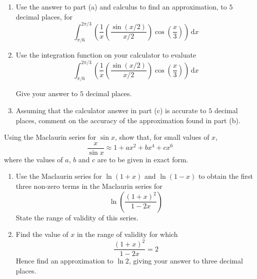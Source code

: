\documentclass[leqno]{article}
\begin{document}
\begin{enumerate}[
  label=\textbf{\arabic*.},
  leftmargin=*,
  topsep=0pt,
  partopsep=0pt,
  parsep=0pt
]
\begin{enumerate}[label=\textbf{(\alph*)}]
  Give each term in simplest form.  \\
  \item Use the answer to part (a) and calculus to find an approximation, to $5$ decimal places, for
  \[
  \int_{\pi/6}^{2\pi/3} \left( \frac{1}{x}\left(\frac{\sin(x/2)}{x/2}\right)\cos\left(\frac{x}{3}\right) \right) \, \mathrm{d}x
  \]
  \item Use the integration function on your calculator to evaluate
  \[
  \int_{\pi/6}^{2\pi/3} \left( \frac{1}{x}\left(\frac{\sin(x/2)}{x/2}\right)\cos\left(\frac{x}{3}\right) \right) \, \mathrm{d}x
  \]

  Give your answer to $5$ decimal places.  \\
  \item Assuming that the calculator answer in part (c) is accurate to $5$ decimal places, comment on the accuracy of the approximation found in part (b).  \\
\end{enumerate}

\newpage

\questionitem

Using the Maclaurin series for $\sin x$, show that, for small values of $x$,
\[
\frac{x}{\sin x} \approx 1 + ax^2 + bx^4 + cx^6
\]
where the values of $a$, $b$ and $c$ are to be given in exact form. 

\newpage

\questionitem

\begin{enumerate}[label=\textbf{(\roman*)}]
  \item Use the Maclaurin series for $\ln(1+x)$ and $\ln(1-x)$ to obtain the first three non-zero terms in the Maclaurin series for
  \[
  \ln\left(\frac{(1+x)^2}{1-2x}\right)
  \]
  State the range of validity of this series.  \\
  \item Find the value of $x$ in the range of validity for which
  \[
  \frac{(1+x)^2}{1-2x}=2
  \]
  Hence find an approximation to $\ln 2$, giving your answer to three decimal places.  \\
\end{enumerate}

\newpage

\questionitem


\end{enumerate}
\end{document}
